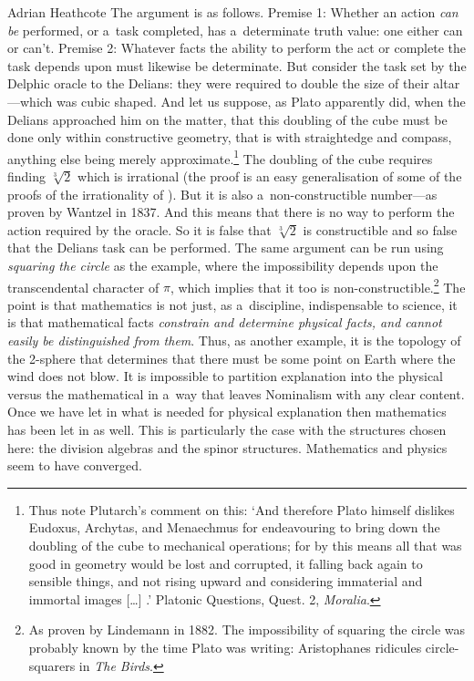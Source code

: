 \begin{artengenv}{Adrian Heathcote}
The argument is as follows. Premise 1: Whether an action \textit{can be} performed, or a~task completed, has a~determinate truth value: one either can or can't. Premise 2: Whatever facts the ability to perform the act or complete the task depends upon must likewise  be determinate.  But consider the task set by the Delphic oracle to the Delians: they were required to double the size of their altar---which was cubic shaped. And let us suppose, as Plato apparently did, when the Delians approached him on the matter, that this doubling of the cube must be done only within constructive geometry, that is with straightedge and compass, anything else being merely approximate.\footnote{Thus note Plutarch's comment on this: `And therefore Plato himself dislikes Eudoxus, Archytas, and Menaechmus for endeavouring to bring down the doubling of the cube to mechanical operations; for by this means all that was good in geometry would be lost and corrupted, it falling back again to sensible things, and not rising upward and considering immaterial and immortal images [\ldots] .' Platonic Questions, Quest. 2, \textit{Moralia}.} The doubling of the cube requires finding $\sqrt[3]{2}$ which is irrational (the proof is an easy generalisation of some of the proofs of the irrationality of \sqrtwo). But it is also a~non-constructible number---as proven by Wantzel in 1837. And this means that there is no way to perform the action required by the oracle. So it is false that $\sqrt[3]{2}$ is constructible and so false that the Delians task can be performed. The same argument can be run using \textit{squaring the circle} as the example, where the impossibility depends upon the transcendental character of $\pi$, which implies that it too is non-constructible.\footnote{As proven by Lindemann in 1882. The impossibility of squaring the circle was probably known by the time Plato was writing: Aristophanes ridicules circle-squarers in \textit{The Birds}.} The point is that mathematics is not just, as a~discipline, indispensable to science, it is that mathematical facts \textit{constrain and determine physical facts, and cannot easily be distinguished from them}. Thus, as another example, it is the topology of the 2-sphere that determines that there must be some point on Earth where the wind does not blow. It is impossible to partition explanation into the physical versus the mathematical in a~way that leaves Nominalism with any clear content. Once we have let in what is needed for physical explanation then mathematics has been let in as well. This is particularly the case with the structures chosen here: the division algebras and the spinor structures. Mathematics and physics seem to have converged.



\end{artengenv}
